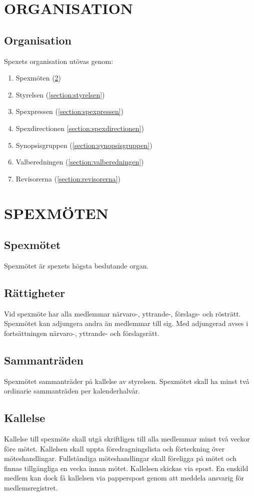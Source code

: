 \documentclass[a4paper]{article}
\begin{document}
\section{ORGANISATION}
\subsection{Organisation}
Spexets organisation utövas genom:

\begin{enumerate}
  \item Spexmöten (\ref{section:spexmöten})
  \item Styrelsen (\ref{section:styrelsen})
  \item Spexpressen (\ref{section:spexpressen})
  \item Spexdirectionen \ref{section:spexdirectionen})
  \item Synopsisgruppen (\ref{section:synopsisgruppen})
  \item Valberedningen (\ref{section:valberedningen})
  \item Revisorerna (\ref{section:revisorerna})
\end{enumerate}

\section{SPEXMÖTEN}
\label{section:spexmöten}

\subsection{Spexmötet}
Spexmötet är spexets högsta beslutande organ.

\subsection{Rättigheter}
Vid spexmöte har alla medlemmar närvaro-, yttrande-, förslags- och rösträtt. Spexmötet kan adjungera andra än medlemmar till sig. Med adjungerad avses i fortsättningen närvaro-, yttrande- och förslagsrätt.

\subsection{Sammanträden}
Spexmötet sammanträder på kallelse av styrelsen. Spexmötet skall ha minst två ordinarie sammanträden per kalenderhalvår.

\subsection{Kallelse}
Kallelse till spexmöte skall utgå skriftligen till alla medlemmar minst två veckor före mötet. Kallelsen skall uppta föredragningslista och förteckning över möteshandlingar. Fullständiga möteshandlingar skall föreligga på mötet och finnas tillgängliga en vecka innan mötet.\newline
\newline
Kallelsen skickas via epost. En enskild medlem kan dock få kallelsen via papperspost genom att meddela ansvarig för medlemsregistret.
\end{document}
